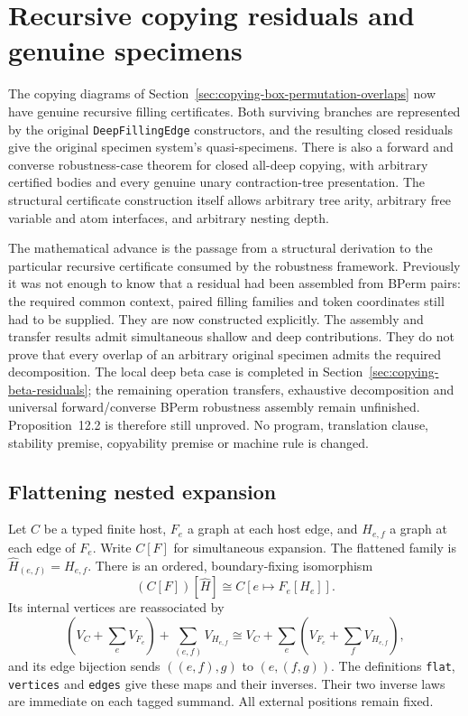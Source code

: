 \clearpage
\section{Recursive copying residuals and genuine specimens}
\label{sec:copying-residual-specimens}
The copying diagrams of Section~\ref{sec:copying-box-permutation-overlaps}
now have genuine recursive filling certificates. Both surviving branches are
represented by the original \texttt{DeepFillingEdge} constructors, and the
resulting closed residuals give the original specimen system's quasi-specimens.
There is also a forward and converse robustness-case theorem for closed
all-deep copying, with arbitrary certified bodies and every genuine unary
contraction-tree presentation. The structural certificate construction itself
allows arbitrary tree arity, arbitrary free variable and atom interfaces, and
arbitrary nesting depth.

The mathematical advance is the passage from a structural derivation to the
particular recursive certificate consumed by the robustness framework.
Previously it was not enough to know that a residual had been assembled from
BPerm pairs: the required common context, paired filling families and token
coordinates still had to be supplied. They are now constructed explicitly.
The assembly and transfer results admit simultaneous shallow and deep
contributions. They do not prove that every overlap of an arbitrary original
specimen admits the required decomposition. The local deep beta
case is completed in Section~\ref{sec:copying-beta-residuals}; the remaining
operation transfers, exhaustive decomposition and universal forward/converse
BPerm robustness assembly remain unfinished. Proposition~12.2 is
therefore still unproved. No program, translation clause, stability premise,
copyability premise or machine rule is changed.

\subsection{Flattening nested expansion}
Let $C$ be a typed finite host, $F_e$ a graph at each host edge, and $H_{e,f}$
a graph at each edge of $F_e$. Write $C[F]$ for simultaneous expansion. The
flattened family is $\widehat H_{(e,f)}=H_{e,f}$. There is an ordered,
boundary-fixing isomorphism
\[
 (C[F])[\widehat H]\cong C[e\mapsto F_e[H_e]].
\]
Its internal vertices are reassociated by
\[
 (V_C+\textstyle\sum_e V_{F_e})+
   \textstyle\sum_{(e,f)}V_{H_{e,f}}
 \cong V_C+\textstyle\sum_e(V_{F_e}+\sum_f V_{H_{e,f}}),
\]
and its edge bijection sends $((e,f),g)$ to $(e,(f,g))$.
The definitions \texttt{flat}, \texttt{vertices} and \texttt{edges} give these
maps and their inverses. Their two inverse laws are immediate on each tagged
summand. All external positions remain fixed.

